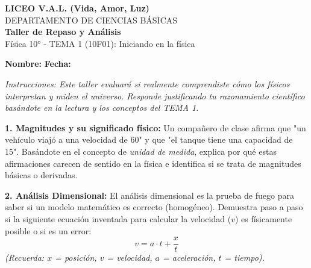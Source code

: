 \documentclass[12pt, letterpaper]{article}
\newif\ifshowanswers
\newcommand{\respAbierta}[2][3cm]{
	\ifshowanswers
	\par\vspace{0.2cm}
	\textbf{\textcolor{blue}{Respuesta Esperada:}} \textcolor{blue}{#2}
	\par\vspace{0.2cm}
	\else
	\par\vspace{#1} %
	\fi
}
\begin{document}
	
	\begin{center} 
		{\Large \textbf{LICEO V.A.L. (Vida, Amor, Luz)}}\\[0.1cm] 
		{\large DEPARTAMENTO DE CIENCIAS BÁSICAS}\\[0.1cm] 
		\textbf{Taller de Repaso y Análisis} \\[0.1cm] 
		Física 10° - TEMA 1 (10F01): Iniciando en la física 
	\end{center}
	
	\vspace{0.3cm}
	\noindent \textbf{Nombre:} \underline{\hspace{8cm}} \hspace{1cm}\textbf{Fecha:} \underline{\hspace{3cm}}
	
	\vspace{0.5cm}
	\begin{tcolorbox}[colback=gray!10!white, colframe=black, arc=1mm]
		\textit{Instrucciones: Este taller evaluará si realmente comprendiste cómo los físicos interpretan y miden el universo. Responde justificando tu razonamiento científico basándote en la lectura y los conceptos del TEMA 1.}
	\end{tcolorbox}
	
	\vspace{0.5cm}
	
	\noindent \textbf{1. Magnitudes y su significado físico:} Un compañero de clase afirma que "un vehículo viajó a una velocidad de 60" y que "el tanque tiene una capacidad de 15". Basándote en el concepto de \textit{unidad de medida}, explica por qué estas afirmaciones carecen de sentido en la física e identifica si se trata de magnitudes básicas o derivadas.
	\respAbierta[3.5cm]{Las afirmaciones no tienen sentido porque un número por sí solo no describe una propiedad física real; la unidad de medida es el patrón indispensable para darle lógica a la magnitud. La velocidad es una magnitud derivada (combina longitud y tiempo), mientras que la capacidad (volumen) también es derivada (combina longitudes al cubo).}
	
	\vspace{0.3cm}
	
	\noindent \textbf{2. Análisis Dimensional:} El análisis dimensional es la prueba de fuego para saber si un modelo matemático es correcto (homogéneo). Demuestra paso a paso si la siguiente ecuación inventada para calcular la velocidad ($v$) es físicamente posible o si es un error: 
	\[ v = a \cdot t + \frac{x}{t} \]
	\textit{(Recuerda: $x$ = posición, $v$ = velocidad, $a$ = aceleración, $t$ = tiempo).}
	\respAbierta[4.5cm]{Al reemplazar las dimensiones tenemos: $[v] = L/T$. 
		El primer término $a \cdot t = (L/T^2) \cdot T = L/T$. 
		El segundo término $x / t = L/T$. 
		Al sumar: $L/T = L/T + L/T$. Como todos los términos tienen exactamente la misma dimensión (longitud sobre tiempo), la ecuación SÍ es homogénea y es físicamente correcta.}
	
\end{document}
